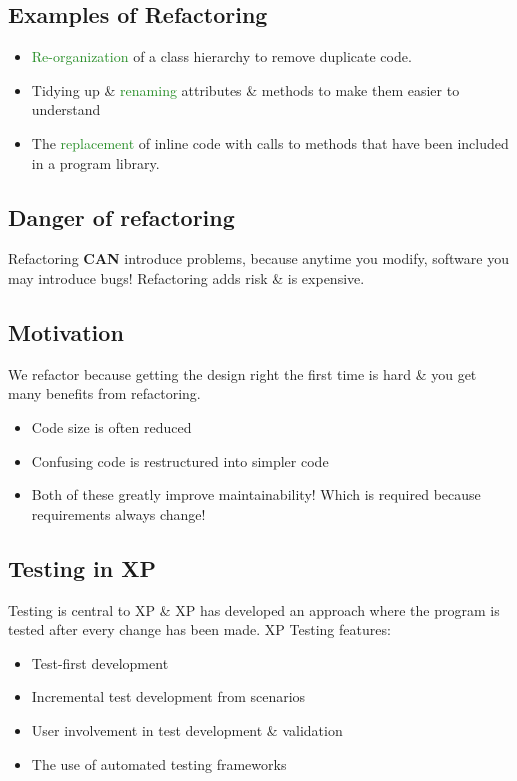 \documentclass{report}
\newcommand{\textg}[1]{\textcolor{ForestGreen}{#1}}
\begin{document}
\newpage
\subsection{Examples of Refactoring}
\noindent
\begin{itemize}
  \item \textg{Re-organization} of a class hierarchy to remove duplicate code.
  \item Tidying up \& \textg{renaming} attributes \& methods to make them easier to understand
  \item The \textg{replacement} of inline code with calls to methods that have been included in a program library.
\end{itemize}

\subsection{Danger of refactoring}
\noindent Refactoring \textbf{CAN} introduce problems, because anytime you modify, software you may introduce bugs! Refactoring adds risk \& is expensive.

\subsection{Motivation}
\noindent We refactor because getting the design right the first time is hard \& you get many benefits from refactoring.
\begin{itemize}
  \item Code size is often reduced
  \item Confusing code is restructured into simpler code
  \item Both of these greatly improve maintainability! Which is required because requirements always change!
\end{itemize}

\subsection{Testing in XP}
\noindent Testing is central to XP \& XP has developed an approach where the program is tested after every change has been made. XP Testing features:
\begin{itemize}
  \item Test-first development
  \item Incremental test development from scenarios
  \item User involvement in test development \& validation
  \item The use of automated testing frameworks
\end{itemize}
\end{document}
